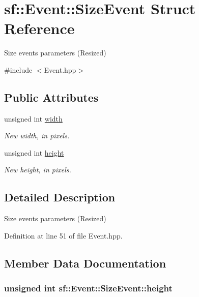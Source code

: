 \hypertarget{structsf_1_1_event_1_1_size_event}{\section{sf\-:\-:Event\-:\-:Size\-Event Struct Reference}
\label{structsf_1_1_event_1_1_size_event}
}


Size events parameters (Resized)  




{\ttfamily \#include $<$Event.\-hpp$>$}

\subsection*{Public Attributes}
\begin{DoxyCompactItemize}
\item 
unsigned int \hyperlink{structsf_1_1_event_1_1_size_event_a20ea1b78c9bb1604432f8f0067bbfd94}{width}
\begin{DoxyCompactList}\small\item\em New width, in pixels. \end{DoxyCompactList}\item 
unsigned int \hyperlink{structsf_1_1_event_1_1_size_event_af0f76a599d5f48189cb8d78d4e5facdb}{height}
\begin{DoxyCompactList}\small\item\em New height, in pixels. \end{DoxyCompactList}\end{DoxyCompactItemize}


\subsection{Detailed Description}
Size events parameters (Resized) 

Definition at line 51 of file Event.\-hpp.



\subsection{Member Data Documentation}
\hypertarget{structsf_1_1_event_1_1_size_event_af0f76a599d5f48189cb8d78d4e5facdb}{
\subsubsection[{height}]{\setlength{\rightskip}{0pt plus 5cm}unsigned int sf\-::\-Event\-::\-Size\-Event\-::height}}\label{structsf_1_1_event_1_1_size_event_af0f76a599d5f48189cb8d78d4e5facdb}



